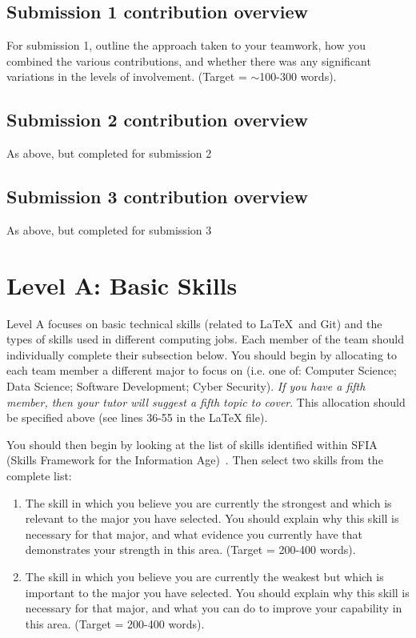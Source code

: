 \documentclass[a4paper, 11pt]{report}
\begin{document}
\subsection{Submission 1 contribution overview}

For submission 1, outline the approach taken to your teamwork, how you combined the various contributions, and whether there was any significant variations in the levels of involvement. (Target = $\sim$100-300 words).

\subsection{Submission 2 contribution overview}

As above, but completed for submission 2

\subsection{Submission 3 contribution overview}

As above, but completed for submission 3



\newpage
\section{Level A: Basic Skills}

Level A focuses on basic technical skills (related to \LaTeX\ and Git) and the types of skills used in different computing jobs. Each member of the team should individually complete their subsection below. You should begin by allocating to each team member a different major to focus on (i.e. one of: Computer Science; Data Science; Software Development; Cyber Security). \textit{If you have a fifth member, then your tutor will suggest a fifth topic to cover}. This allocation should be specified above (see lines 36-55 in the LaTeX file).

You should then begin by looking at the list of skills identified within SFIA (Skills Framework for the Information Age)~\cite{sfia}. Then select two skills from the complete list:
\begin{enumerate}
	\item The skill in which you believe you are currently the strongest and which is relevant to the major you have selected. You should explain why this skill is necessary for that major, and what evidence you currently have that demonstrates your strength in this area. (Target = 200-400 words).
	\item The skill in which you believe you are currently the weakest but which is important to the major you have selected. You should explain why this skill is necessary for that major, and what you can do to improve your capability in this area. (Target = 200-400 words).
\end{enumerate}
\end{document}

